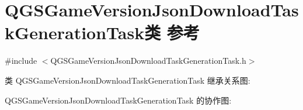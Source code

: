\hypertarget{class_q_g_s_game_version_json_download_task_generation_task}{}\section{Q\+G\+S\+Game\+Version\+Json\+Download\+Task\+Generation\+Task类 参考}
\label{class_q_g_s_game_version_json_download_task_generation_task}


{\ttfamily \#include $<$Q\+G\+S\+Game\+Version\+Json\+Download\+Task\+Generation\+Task.\+h$>$}



类 Q\+G\+S\+Game\+Version\+Json\+Download\+Task\+Generation\+Task 继承关系图\+:


Q\+G\+S\+Game\+Version\+Json\+Download\+Task\+Generation\+Task 的协作图\+:
